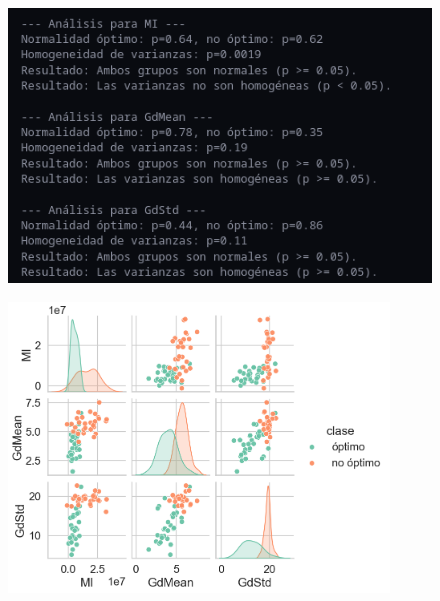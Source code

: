 \documentclass{beamer}
\begin{document}
\begin{frame}
    \begin{figure}
        \includegraphics[width=\textwidth]{shapiro.levene.png}
    \end{figure}
\end{frame}

\begin{frame}
    \begin{figure}
        \includegraphics[width=0.9\textwidth]{mcevents.png}
    \end{figure}
\end{frame}
\end{document}
